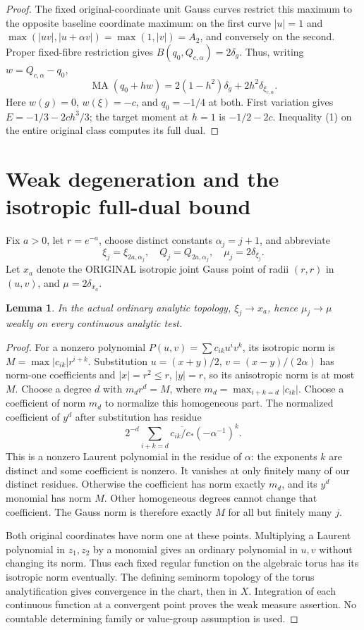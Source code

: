 \documentclass[11pt]{article}
\newtheorem{lemma}[theorem]{Lemma}
\newcommand{\MA}{\operatorname{MA}}
\begin{document}
\begin{proof}
The fixed original-coordinate unit Gauss curves restrict this maximum
to the opposite baseline coordinate maximum: on the first curve
$|u|=1$ and $\max(|uv|,|u+\alpha v|)=\max(1,|v|)=A_2$, and conversely
on the second. Proper fixed-fibre restriction gives
$B(q_0,Q_{c,\alpha})=2\delta_g$. Thus, writing $w=Q_{c,\alpha}-q_0$,
\[
 \MA(q_0+h w)=2(1-h^2)\delta_g+2h^2\delta_{\xi_{c,\alpha}}.
\]
Here $w(g)=0$, $w(\xi)=-c$, and $q_0=-1/4$ at both. First variation
gives $E=-1/3-2ch^3/3$; the target moment at $h=1$ is $-1/2-2c$.
Inequality (1) on the entire original class computes its full dual.
\end{proof}

\section{Weak degeneration and the isotropic full-dual bound}
Fix $a>0$, let $r=e^{-a}$, choose distinct constants
$\alpha_j=j+1$, and abbreviate
\[
 \xi_j=\xi_{2a,\alpha_j},\quad Q_j=Q_{2a,\alpha_j},\quad
 \mu_j=2\delta_{\xi_j}.
\]
Let $x_a$ denote the ORIGINAL isotropic joint Gauss point of radii $(r,r)$
in $(u,v)$, and $\mu=2\delta_{x_a}$.

\begin{lemma}\label{weak}
In the actual ordinary analytic topology, $\xi_j\to x_a$, hence
$\mu_j\to\mu$ weakly on every continuous analytic test.
\end{lemma}
\begin{proof}
For a nonzero polynomial $P(u,v)=\sum c_{ik}u^iv^k$, its isotropic norm is
$M=\max |c_{ik}|r^{i+k}$. Substitution
$u=(x+y)/2$, $v=(x-y)/(2\alpha)$ has norm-one coefficients and
$|x|=r^2\le r$, $|y|=r$, so its anisotropic norm is at most $M$.
Choose a degree $d$ with $m_dr^d=M$, where
$m_d=\max_{i+k=d}|c_{ik}|$. Choose a coefficient of norm $m_d$ to
normalize this homogeneous part. The normalized coefficient of $y^d$
after substitution has residue
\[
 2^{-d}\sum_{i+k=d}\overline{c_{ik}/c_*}(-\alpha^{-1})^k.
\]
This is a nonzero Laurent polynomial in the residue of $\alpha$:
the exponents $k$ are distinct and some coefficient is nonzero. It
vanishes at only finitely many of our distinct residues. Otherwise the
coefficient has norm exactly $m_d$, and its $y^d$ monomial has norm $M$.
Other homogeneous degrees cannot change that coefficient. The Gauss norm
is therefore exactly $M$ for all but finitely many $j$.

Both original coordinates have norm one at these points. Multiplying a
Laurent polynomial in $z_1,z_2$ by a monomial gives an ordinary polynomial
in $u,v$ without changing its norm. Thus each fixed regular function on
the algebraic torus has its isotropic norm eventually. The defining
seminorm topology of the torus analytification gives convergence in the
chart, then in $X$. Integration of each continuous function at a convergent
point proves the weak measure assertion. No countable determining family
or value-group assumption is used.
\end{proof}
\end{document}

